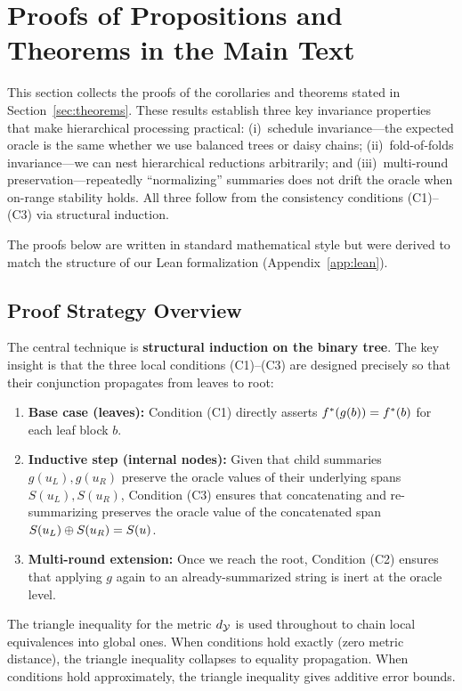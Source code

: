 \section{Proofs of Propositions and Theorems in the Main Text}
\label{app:proofs-core}

This section collects the proofs of the corollaries and theorems stated in Section~\ref{sec:theorems}. These results establish three key invariance properties that make hierarchical processing practical: (i)~schedule invariance—the expected oracle is the same whether we use balanced trees or daisy chains; (ii)~fold-of-folds invariance—we can nest hierarchical reductions arbitrarily; and (iii)~multi-round preservation—repeatedly ``normalizing'' summaries does not drift the oracle when on-range stability holds. All three follow from the consistency conditions (C1)--(C3) via structural induction.

The proofs below are written in standard mathematical style but were derived to match the structure of our Lean formalization (Appendix~\ref{app:lean}).

\subsection{Proof Strategy Overview}

The central technique is \textbf{structural induction on the binary tree}. The key insight is that the three local conditions (C1)--(C3) are designed precisely so that their conjunction propagates from leaves to root:

\begin{enumerate}
    \item \textbf{Base case (leaves):} Condition (C1) directly asserts $f^{\ast}(g(b)) = f^{\ast}(b)$ for each leaf block $b$.

    \item \textbf{Inductive step (internal nodes):} Given that child summaries $g(u_L), g(u_R)$ preserve the oracle values of their underlying spans $S(u_L), S(u_R)$, Condition (C3) ensures that concatenating and re-summarizing preserves the oracle value of the concatenated span $S(u_L) \oplus S(u_R) = S(u)$.

    \item \textbf{Multi-round extension:} Once we reach the root, Condition (C2) ensures that applying $g$ again to an already-summarized string is inert at the oracle level.
\end{enumerate}

The triangle inequality for the metric $d_{\mathcal{Y}}$ is used throughout to chain local equivalences into global ones. When conditions hold exactly (zero metric distance), the triangle inequality collapses to equality propagation. When conditions hold approximately, the triangle inequality gives additive error bounds.

